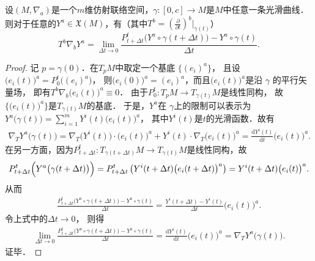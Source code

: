 \begin{theorem}\label{chccr:thm_parallel-transport}
    设$(M, \nabla_a)$是一个$m$维仿射联络空间，$\gamma:[0, c] \to M$是$M$中任意一条光滑曲线．
    则对于任意的$Y^a \in \mathfrak{X}(M)$，有（其中$T^b=(\frac{\partial}{\partial t})^b|_{\gamma(t)}$）
    \begin{equation}\label{chccr:eqn_parallel-transport}
        T^b\nabla_b Y^a= \lim _{\Delta t \to 0} \frac{P_{t+\Delta t}^t
            \bigl(Y^a \circ \gamma(t+\Delta t)\bigr)-Y^a \circ \gamma(t)}{\Delta t} .
    \end{equation}    
\end{theorem}
\begin{proof}
记 $p=\gamma(0)$．在$T_p M$中取定一个基底 $\{(e_i)^a\}$，
且设$\bigl(e_i(t)\bigr)^a=P_0^t\bigl((e_i)^a\bigr)$，
则$\bigl(e_i(0)\bigr)^a=(e_i)^a$，而且$\bigl(e_i(t)\bigr)^a$是沿 $\gamma$ 的平行矢量场，
即有$T^b\nabla_b \bigl(e_i(t)\bigr)^a \equiv 0$．
由于$P_0^t: T_p M \rightarrow T_{\gamma(t)} M$是线性同构，
故$\{\bigl(e_i(t)\bigr)^a\}$是$T_{\gamma(t)} M$的基底．
于是，$Y^a$在 $\gamma$上的限制可以表示为$Y^a\bigl(\gamma(t)\bigr)=\sum_{i=1}^m Y^i(t) \bigl(e_i(t)\bigr)^a$，
其中$Y^i(t)$是$t$的光滑函数．故有
\begin{align*}
    \nabla_T Y^a\bigl(\gamma(t)\bigr)= \nabla_T\bigl(Y^i(t)\bigr) \cdot \bigl(e_i(t)\bigr)^a
    +Y^i(t) \cdot \nabla_T \bigl(e_i(t)\bigr)^a
    = \frac{\mathrm{d} Y^i(t)}{\mathrm{d} t}   \bigl(e_i(t)\bigr)^a .
\end{align*}
在另一方面，因为$P_{t+\Delta t}^t: T_{\gamma(t+\Delta t)} M \rightarrow T_{\gamma(t)} M$是线性同构，故
\begin{align*}
    P_{t+\Delta t}^t\Bigl(Y^a\bigl(\gamma(t+\Delta t)\bigr)\Bigr)  
    =P_{t+\Delta t}^t\left(Y^i(t+\Delta t)   \bigl(e_i(t+\Delta t)\bigr)^a \right) 
    =Y^i(t+\Delta t) \bigl(e_i(t) \bigr)^a.
\end{align*}
从而
\begin{align*}
    \frac{P_{t+\Delta t}^t\bigl(Y^a \circ \gamma(t+\Delta t)\bigr)- Y^a \circ \gamma(t)}{\Delta t}
    =\frac{Y^i(t+\Delta t)-Y^i(t)}{\Delta t} \bigl(e_i(t)\bigr)^a .
\end{align*}
令上式中的$\Delta t \rightarrow 0$， 则得
\begin{align*}
    \lim _{\Delta t \to 0} \frac{P_{t+\Delta t}^t\bigl(Y^a \circ \gamma(t+\Delta t)\bigr)-Y^a \circ \gamma(t)}{\Delta t} 
    =\frac{\mathrm{d} Y^i(t)}{\mathrm{d} t} \bigl(e_i(t)\bigr)^a= \nabla_T Y^a\bigl(\gamma(t)\bigr) .
\end{align*}
证毕．
\end{proof}

